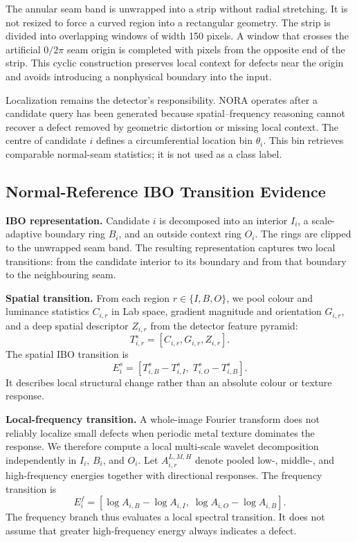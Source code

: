 The annular seam band is unwrapped into a strip without radial stretching. It is not resized to force a curved region into a rectangular geometry. The strip is divided into overlapping windows of width 150 pixels. A window that crosses the artificial $0/2\pi$ seam origin is completed with pixels from the opposite end of the strip. This cyclic construction preserves local context for defects near the origin and avoids introducing a nonphysical boundary into the input.

Localization remains the detector's responsibility. NORA operates after a candidate query has been generated because spatial--frequency reasoning cannot recover a defect removed by geometric distortion or missing local context. The centre of candidate $i$ defines a circumferential location bin $\theta_i$. This bin retrieves comparable normal-seam statistics; it is not used as a class label.

\subsection{Normal-Reference IBO Transition Evidence}
\label{sec:ibo-evidence}

\textbf{IBO representation.} Candidate $i$ is decomposed into an interior $I_i$, a scale-adaptive boundary ring $B_i$, and an outside context ring $O_i$. The rings are clipped to the unwrapped seam band. The resulting representation captures two local transitions: from the candidate interior to its boundary and from that boundary to the neighbouring seam.

\textbf{Spatial transition.} From each region $r\in\{I,B,O\}$, we pool colour and luminance statistics $C_{i,r}$ in Lab space, gradient magnitude and orientation $G_{i,r}$, and a deep spatial descriptor $Z_{i,r}$ from the detector feature pyramid:
\begin{equation}
T_{i,r}^{s}=[C_{i,r},G_{i,r},Z_{i,r}].
\end{equation}
The spatial IBO transition is
\begin{equation}
E_i^{s}=[T_{i,B}^{s}-T_{i,I}^{s},\;T_{i,O}^{s}-T_{i,B}^{s}].
\label{eq:spatial-transition}
\end{equation}
It describes local structural change rather than an absolute colour or texture response.

\textbf{Local-frequency transition.} A whole-image Fourier transform does not reliably localize small defects when periodic metal texture dominates the response. We therefore compute a local multi-scale wavelet decomposition independently in $I_i$, $B_i$, and $O_i$. Let $A_{i,r}^{L,M,H}$ denote pooled low-, middle-, and high-frequency energies together with directional responses. The frequency transition is
\begin{equation}
E_i^{f}=[\log A_{i,B}-\log A_{i,I},\;\log A_{i,O}-\log A_{i,B}].
\label{eq:frequency-transition}
\end{equation}
The frequency branch thus evaluates a local spectral transition. It does not assume that greater high-frequency energy always indicates a defect.

